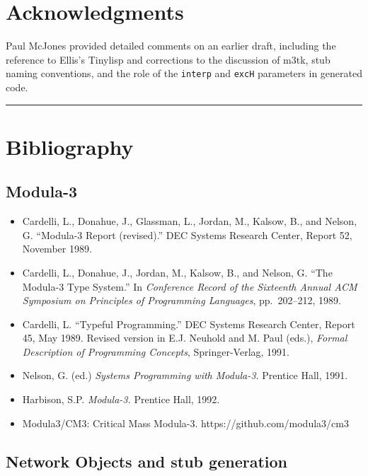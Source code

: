 \documentclass[
  12pt,
]{report}
\newcommand{\passthrough}[1]{#1}
\begin{document}
\section{Acknowledgments}\label{acknowledgments}

Paul McJones provided detailed comments on an earlier draft, including
the reference to Ellis's Tinylisp and corrections to the discussion of
m3tk, stub naming conventions, and the role of the
\passthrough{\lstinline!interp!} and \passthrough{\lstinline!excH!}
parameters in generated code.

\begin{center}\rule{0.5\linewidth}{0.5pt}\end{center}

\section{Bibliography}\label{bibliography}

\subsection{Modula-3}\label{modula-3}

\begin{itemize}
\item
  Cardelli, L., Donahue, J., Glassman, L., Jordan, M., Kalsow, B., and
  Nelson, G. ``Modula-3 Report (revised).'' DEC Systems Research Center,
  Report 52, November 1989.
\item
  Cardelli, L., Donahue, J., Jordan, M., Kalsow, B., and Nelson, G.
  ``The Modula-3 Type System.'' In \emph{Conference Record of the
  Sixteenth Annual ACM Symposium on Principles of Programming
  Languages}, pp.~202--212, 1989.
\item
  Cardelli, L. ``Typeful Programming.'' DEC Systems Research Center,
  Report 45, May 1989. Revised version in E.J. Neuhold and M. Paul
  (eds.), \emph{Formal Description of Programming Concepts},
  Springer-Verlag, 1991.
\item
  Nelson, G. (ed.) \emph{Systems Programming with Modula-3.} Prentice
  Hall, 1991.
\item
  Harbison, S.P. \emph{Modula-3.} Prentice Hall, 1992.
\item
  Modula3/CM3: Critical Mass Modula-3. https://github.com/modula3/cm3
\end{itemize}

\subsection{Network Objects and stub
generation}\label{network-objects-and-stub-generation}
\end{document}
